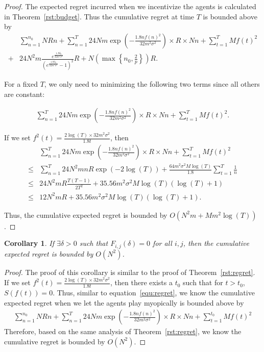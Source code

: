 \documentclass{article}
\newtheorem{corollary}{Corollary}
\begin{document}
\begin{proof}
The expected regret incurred when we incentivize the agents is calculated in Theorem~\ref{rst:budget}. Thus the cumulative regret at time $T$ is bounded above by
\begin{align}
&\sum_{n=1}^{n_{0}}NRn + \sum_{n=1}^{T} 24Nm\exp\left(-\frac{1.8n f(n)^2}{32 m^2\sigma^2}\right)\times R \times Nn+ \sum_{t=1}^{T}Mf(t)^2 \nonumber \\
+ & 24N^2 m \frac{e^{\frac{1.8\delta_{0}}{32m^2\sigma^2}}}{(e^{\frac{1.8\delta_{0}}{32m^2\sigma^2}}-1)^2}R+N\left(\max\left\{n_{0},\frac{2}{p}\right\}\right)R. \nonumber
\end{align}

For a fixed $T$, we only need to minimizing the following two terms since all others are constant:

\begin{align}
\sum_{n=1}^{T} 24Nm\exp\left(-\frac{1.8n f(n)^2}{32 m^2\sigma^2}\right)\times R \times Nn+ \sum_{t=1}^{T}Mf(t)^2.
\end{align}


If we set $f^2(t)=\frac{2\log(T)\times 32m^2\sigma^2}{1.8t}$, then
\begin{align}
&\sum_{n=1}^{T} 24Nm\exp\left(-\frac{1.8n f(n)^2}{32 m^2\sigma^2}\right)\times R \times Nn+ \sum_{t=1}^{T}Mf(t)^2 \nonumber \\ 
\leq & \sum_{n=1}^{T} 24N^2 mnR \exp\left(-2\log(T)\right)  + \frac{64m^2\sigma^2 M\log(T)}{1.8}\sum_{t=1}^{T}\frac{1}{n} \nonumber \\
\leq &  24N^2 m R\frac{T(T-1)}{2T^2}  + 35.56 m^2\sigma^2 M\log(T)(\log(T)+1) \nonumber \\
\leq &  12 N^2 m R  + 35.56 m^2\sigma^2 M\log(T)(\log(T)+1). \nonumber
\end{align}

Thus, the cumulative expected regret is bounded by $O(N^2 m + M m^2\log(T))$.
\end{proof}

\begin{corollary}
If $\exists \delta>0$ such that $F_{i,j}(\delta)=0$ for all $i,j$, then the cumulative expected regret is bounded by $O(N^2)$.
\end{corollary}

\begin{proof}
The proof of this corollary is similar to the proof of Theorem~\ref{rst:regret}. If we set $f^2(t)=\frac{2\log(T)\times 32m^2\sigma^2}{1.8t}$, then there exists a $t_{0}$ such that for $t>t_{0}$, $S(f(t))=0$. Thus, similar to equation~\eqref{equ:regret}, we know the cumulative expected regret when we let the agents play myopically is bounded above by
\begin{align}
\sum_{n=1}^{n_{0}}NRn + \sum_{n=1}^{T} 24Nm\exp\left(-\frac{1.8n f(n)^2}{32 m^2\sigma^2}\right)\times R \times Nn+ \sum_{t=1}^{t_{0}}Mf(t)^2 \nonumber
\end{align}
Therefore, based on the same analysis of Theorem~\ref{rst:regret}, we know the cumulative regret is bounded by $O(N^2)$.
\end{proof}
\end{document}
